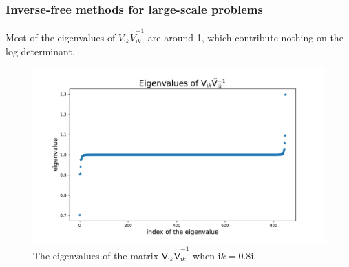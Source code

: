 \documentclass[dvipsnames,10pt]{beamer}
\begin{document}
\begin{frame}
    \frametitle{Inverse-free methods for large-scale problems}
Most of the eigenvalues of $V_{\mathrm{i}k}\tilde{V}_{\mathrm{i}k}^{-1}$ are around 1, which contribute nothing on the log determinant.

\begin{figure}[H]
    \centering
    \includegraphics[scale = 0.35]{figs/eigenvalue_of_VVtilde.pdf}
    \caption{The eigenvalues of the matrix $\mathsf{V}_{\mathrm{i}k}\tilde{\mathsf{V}}_{\mathrm{i}k}^{-1}$ when $\mathrm{i}k = 0.8\mathrm{i}$.}

\end{figure}
\end{frame}
\end{document}
